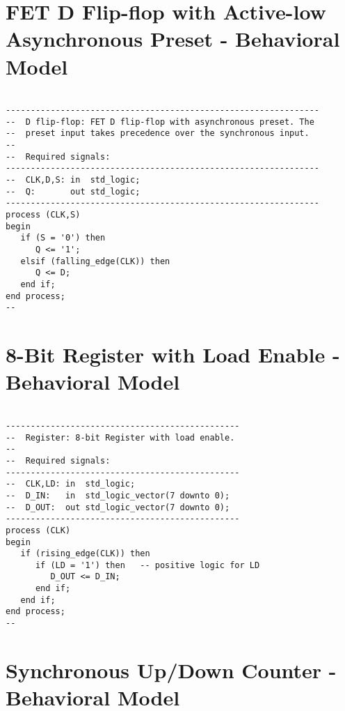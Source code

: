\section{FET D Flip-flop with Active-low Asynchronous Preset - Behavioral Model}

\noindent
\begin{minipage}{0.99\linewidth}
\begin{lstlisting}

---------------------------------------------------------------
--  D flip-flop: FET D flip-flop with asynchronous preset. The 
--  preset input takes precedence over the synchronous input.
--
--  Required signals: 
---------------------------------------------------------------
--  CLK,D,S: in  std_logic;
--  Q:       out std_logic;
---------------------------------------------------------------
process (CLK,S) 
begin
   if (S = '0') then 
      Q <= '1'; 
   elsif (falling_edge(CLK)) then  
      Q <= D;
   end if;
end process;
--
\end{lstlisting}
\end{minipage}

\section{8-Bit Register with Load Enable - Behavioral Model}

\noindent
\begin{minipage}{0.99\linewidth}
\begin{lstlisting}

-----------------------------------------------
--  Register: 8-bit Register with load enable. 
--
--  Required signals: 
-----------------------------------------------
--  CLK,LD: in  std_logic;
--  D_IN:   in  std_logic_vector(7 downto 0);
--  D_OUT:  out std_logic_vector(7 downto 0);
-----------------------------------------------
process (CLK) 
begin
   if (rising_edge(CLK)) then  
      if (LD = '1') then   -- positive logic for LD
         D_OUT <= D_IN;
      end if;
   end if;
end process;
--
\end{lstlisting}
\end{minipage}

\section{Synchronous Up/Down Counter - Behavioral Model}

